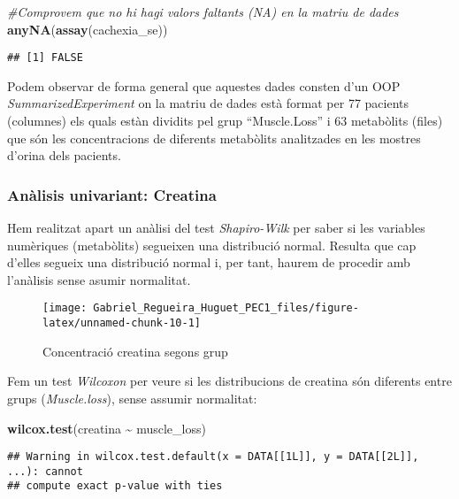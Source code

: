 \documentclass[
]{article}
\newenvironment{Shaded}{\begin{snugshade}}{\end{snugshade}}
\newcommand{\CommentTok}[1]{\textcolor[rgb]{0.56,0.35,0.01}{\textit{#1}}}
\newcommand{\FunctionTok}[1]{\textcolor[rgb]{0.13,0.29,0.53}{\textbf{#1}}}
\newcommand{\NormalTok}[1]{#1}
\newcommand{\SpecialCharTok}[1]{\textcolor[rgb]{0.81,0.36,0.00}{\textbf{#1}}}
\begin{document}
\begin{Shaded}
\begin{Highlighting}[]
\CommentTok{\#Comprovem que no hi hagi valors faltants (NA) en la matriu de dades}
\FunctionTok{anyNA}\NormalTok{(}\FunctionTok{assay}\NormalTok{(cachexia\_se))}
\end{Highlighting}
\end{Shaded}

\begin{verbatim}
## [1] FALSE
\end{verbatim}

Podem observar de forma general que aquestes dades consten d'un OOP
\emph{SummarizedExperiment} on la matriu de dades està format per 77
pacients (columnes) els quals estàn dividits pel grup ``Muscle.Loss'' i
63 metabòlits (files) que són les concentracions de diferents metabòlits
analitzades en les mostres d'orina dels pacients.

\subsubsection{Anàlisis univariant:
Creatina}\label{anuxe0lisis-univariant-creatina}

Hem realitzat apart un anàlisi del test \emph{Shapiro-Wilk} per saber si
les variables numèriques (metabòlits) segueixen una distribució normal.
Resulta que cap d'elles segueix una distribució normal i, per tant,
haurem de procedir amb l'anàlisis sense asumir normalitat.

\begin{figure}

{\centering \texttt{[image: Gabriel\_Regueira\_Huguet\_PEC1\_files/figure-latex/unnamed-chunk-10-1]} 

}

\caption{Concentració creatina segons grup}\label{fig:unnamed-chunk-10}
\end{figure}

Fem un test \emph{Wilcoxon} per veure si les distribucions de creatina
són diferents entre grups (\emph{Muscle.loss}), sense assumir
normalitat:

\begin{Shaded}
\begin{Highlighting}[]
\FunctionTok{wilcox.test}\NormalTok{(creatina }\SpecialCharTok{\textasciitilde{}}\NormalTok{ muscle\_loss) }
\end{Highlighting}
\end{Shaded}

\begin{verbatim}
## Warning in wilcox.test.default(x = DATA[[1L]], y = DATA[[2L]], ...): cannot
## compute exact p-value with ties
\end{verbatim}
\end{document}
